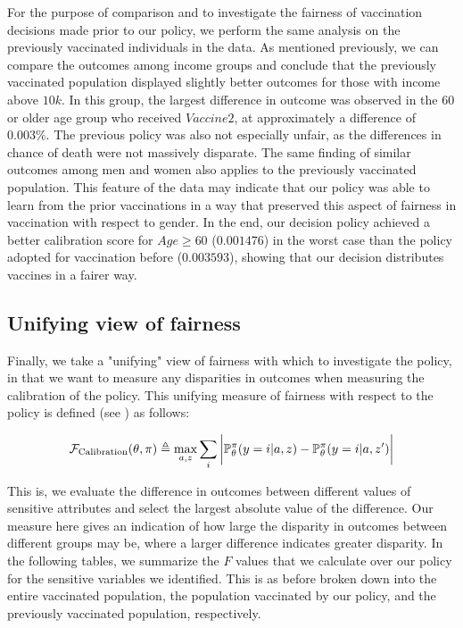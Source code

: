 \documentclass{article}
\begin{document}
For the purpose of comparison and to investigate the fairness of vaccination decisions made prior to our policy, we perform the same analysis on the previously vaccinated individuals in the data. As mentioned previously, we can compare the outcomes among income groups and conclude that the previously vaccinated population displayed slightly better outcomes for those with income above $10k$. In this group, the largest difference in outcome was observed in the $60$ or older age group who received $Vaccine2$, at approximately a difference of $0.003\%$. The previous policy was also not especially unfair, as the differences in chance of death were not massively disparate. The same finding of similar outcomes among men and women also applies to the previously vaccinated population. This feature of the data may indicate that our policy was able to learn from the prior vaccinations in a way that preserved this aspect of fairness in vaccination with respect to gender. In the end, our decision policy achieved a better calibration score for $Age \geq 60$ ($0.001476$) in the worst case than the policy adopted for vaccination before ($0.003593$), showing that our decision distributes vaccines in a fairer way.

\subsection{Unifying view of fairness}
\label{sec: Unifying view of fairness}

Finally, we take a "unifying" view of fairness with which to investigate the policy, in that we want to measure any disparities in outcomes when measuring the calibration of the policy. This unifying measure of fairness with respect to the policy is defined (see \textcolor{blue}{\cite{Dimitrakakis}}) as follows:

\begin{equation}
\label{eq: F_calibration}
    \mathcal{F}_{\text{Calibration}}(\theta, \pi) \triangleq \max_{a, z} \sum_{i} \bigg{|}\mathbb{P}_{\theta}^{\pi}(y=i|a,z) - \mathbb{P}_{\theta}^{\pi}(y=i|a,z^{\prime})\bigg{|}
\end{equation}

This is, we evaluate the difference in outcomes between different values of sensitive attributes and select the largest absolute value of the difference. Our measure here gives an indication of how large the disparity in outcomes between different groups may be, where a larger difference indicates greater disparity. In the following tables, we summarize the $F$ values that we calculate over our policy for the sensitive variables we identified. This is as before broken down into the entire vaccinated population, the population vaccinated by our policy, and the previously vaccinated population, respectively.
\end{document}
